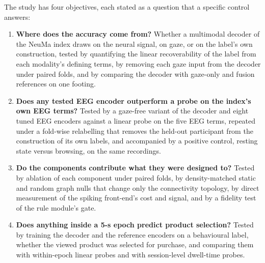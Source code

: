 \documentclass[pdflatex,sn-basic,Numbered,twocolumn,iicol]{sn-jnl}
\theoremstyle{thmstyleone}%
\theoremstyle{thmstyletwo}%
\theoremstyle{thmstylethree}%
\begin{document}
The study has four objectives, each stated as a question that a specific control answers:
\begin{enumerate}
\item[RQ1] \textbf{Where does the accuracy come from?} Whether a multimodal decoder of the NeuMa index draws on the neural signal, on gaze, or on the label's own construction, tested by quantifying the linear recoverability of the label from each modality's defining terms, by removing each gaze input from the decoder under paired folds, and by comparing the decoder with gaze-only and fusion references on one footing.
\item[RQ2] \textbf{Does any tested EEG encoder outperform a probe on the index's own EEG terms?} Tested by a gaze-free variant of the decoder and eight tuned EEG encoders against a linear probe on the five EEG terms, repeated under a fold-wise relabelling that removes the held-out participant from the construction of its own labels, and accompanied by a positive control, resting state versus browsing, on the same recordings.
\item[RQ3] \textbf{Do the components contribute what they were designed to?} Tested by ablation of each component under paired folds, by density-matched static and random graph nulls that change only the connectivity topology, by direct measurement of the spiking front-end's cost and signal, and by a fidelity test of the rule module's gate.
\item[RQ4] \textbf{Does anything inside a 5-s epoch predict product selection?} Tested by training the decoder and the reference encoders on a behavioural label, whether the viewed product was selected for purchase, and comparing them with within-epoch linear probes and with session-level dwell-time probes.
\end{enumerate}
\end{document}
